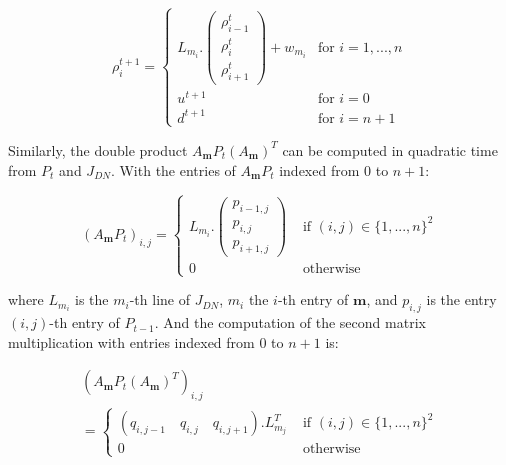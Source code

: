 \begin{equation}
\rho^{t+1}_{i} = \begin{cases}
L_{m_{i}}.\left( \begin{array}{c}
\rho^{t}_{i-1}\\
\rho^{t}_{i}\\
\rho^{t}_{i+1}
\end{array} \right)
+ w_{m_{i}} & \text{for }i=1,...,n\\
u^{t+1} & \text{for }i=0\\
d^{t+1} & \text{for }i=n+1
\end{cases}
\label{eq:underlyingSystemDNcopy}
\end{equation}

\noindent Similarly, the double product $A_{\boldsymbol m}P_{t}(A_{\boldsymbol m})^{T}$ can be computed in quadratic time from $P_{t}$ and $J_{DN}$. With the entries of $A_{\boldsymbol m}P_{t}$ indexed from $0$ to $n+1$:

\begin{equation}
(A_{\boldsymbol m}P_{t})_{i,j} = \begin{cases}
L_{m_{i}}.\left( \begin{array}{c}
p_{i-1,j}\\
p_{i,j}\\
p_{i+1,j}
\end{array} \right) & \text{ if } (i,j)\in\{1,...,n\}^{2}\\
0 & \text{ otherwise}
\end{cases}
\label{eq:predictedCovarianceComputation}
\end{equation}

\noindent where $L_{m_{i}}$ is the $m_{i}$-th line of $J_{DN}$, $m_{i}$ the $i$-th entry of $\boldsymbol m$, and $p_{i,j}$ is the entry $(i,j)$-th entry of $P_{t-1}$. And the computation of the second matrix multiplication with entries indexed from $0$ to $n+1$ is:

\begin{equation}
\begin{array}{l}
(A_{\boldsymbol m}P_{t}(A_{\boldsymbol m})^{T})_{i,j}\\
 = \begin{cases}
(q_{i,j-1}\quad q_{i,j}\quad q_{i,j+1}).L_{m_{j}}^{T} & \text{ if } (i,j)\in\{1,...,n\}^{2}\\
0 & \text{ otherwise}
\end{cases}
\end{array}
\label{eq:predictedCovarianceComputation2}
\end{equation}

